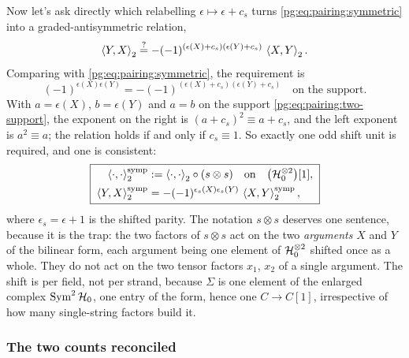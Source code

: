 Now let's ask directly which relabelling $\epsilon\mapsto\epsilon+c_s$ turns \eqref{pg:eq:pairing:symmetric} into a graded-antisymmetric relation,
\begin{equation}
  \label{pg:eq:grading:antisym-demand}
  \braket{Y, X}_2
    \overset{?}{=}
    - (-1)^{(\epsilon(X) + c_s)(\epsilon(Y) + c_s)} \, \braket{X, Y}_2 .
\end{equation}
Comparing with \eqref{pg:eq:pairing:symmetric}, the requirement is
\begin{equation}
  (-1)^{\epsilon(X) \epsilon(Y)}
    = - (-1)^{(\epsilon(X) + c_s)(\epsilon(Y) + c_s)}
  \quad\text{on the support.}
\end{equation}
With $a=\epsilon(X)$, $b=\epsilon(Y)$ and $a=b$ on the support \eqref{pg:eq:pairing:two-support}, the exponent on the right is $(a+c_s)^2\equiv a+c_s$, and the left exponent is $a^2\equiv a$; the relation holds if and only if $c_s\equiv1$.
So exactly one odd shift unit is required, and one is consistent:
\begin{equation}
  \label{pg:eq:grading:symp}
  \boxed{\;
  \begin{aligned}
    \braket{\cdot, \cdot}_2^{\rm symp}
      &
      := \braket{\cdot, \cdot}_2 \circ (s \otimes s)
      \quad\text{on}\quad
      \big( {\mathcal{H}}_0^{\otimes 2} \big)[1],
    \\
    \braket{Y, X}_2^{\rm symp}
      &
      = - (-1)^{\epsilon_s(X) \epsilon_s(Y)} \, \braket{X, Y}_2^{\rm symp},
  \end{aligned}
  \;}
\end{equation}
where $\epsilon_s=\epsilon+1$ is the shifted parity.
The notation $s\otimes s$ deserves one sentence, because it is the trap: the two factors of $s\otimes s$ act on the two \emph{arguments} $X$ and $Y$ of the bilinear form, each argument being one element of ${\mathcal{H}}_0^{\otimes2}$ shifted once as a whole.
They do not act on the two tensor factors $x_1$, $x_2$ of a single argument.
The shift is per field, not per strand, because $\Sigma$ is one element of the enlarged complex $\operatorname{Sym}^2{\mathcal{H}}_0$, one entry of the form, hence one $C\to C[1]$, irrespective of how many single-string factors build it.

\subsubsection{The two counts reconciled}
\label{pg:sec:grading:reconcile}

